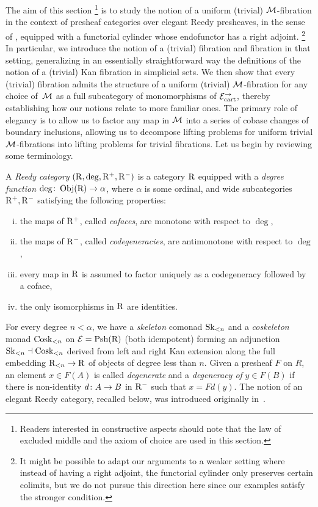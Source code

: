 \documentclass[reqno,10pt,a4paper,oneside,draft]{amsart}
\begin{document}
{{The aim of this section%
\footnote{Readers interested in constructive aspects should note that the law of excluded middle and the axiom of choice are used in this section.}
is to study the notion of a uniform (trivial) $\cal{M}$-fibration in the context of presheaf categories over elegant Reedy presheaves, in the sense of \cite{bergner-rezk-elegant}, equipped with a functorial cylinder whose endofunctor has a right adjoint.%
\footnote{It might be possible to adapt our arguments to a weaker setting where instead of having a right adjoint, the functorial cylinder only preserves certain colimits, but we do not pursue this direction here since our examples satisfy the stronger condition.}
In particular, we introduce the notion of a (trivial) fibration and fibration in that setting, generalizing in an essentially straightforward way the definitions of the notion of a (trivial) Kan fibration in simplicial sets.
We then show that every (trivial) fibration admits the structure of a uniform (trivial) $\cal{M}$-fibration for any choice of~$\cal{M}$ as a full subcategory of monomorphisms of $\cal{E}_{\cart}^\to$, thereby establishing how our notions relate to more familiar ones.
The primary role of elegancy is to allow us to factor any map in $\cal{M}$ into a series of cobase changes of boundary inclusions, allowing us to decompose lifting problems for uniform trivial $\cal{M}$-fibrations into lifting problems for trivial fibrations.
Let us begin by reviewing some terminology.

\begin{definition}
A \emph{Reedy category} $(\R, \deg, \Rp, \Rm)$ is a category $\R$ equipped with a \emph{degree function} $\deg \co \obj(\R) \to \alpha$, where $\alpha$ is some ordinal, and wide subcategories $\Rp, \Rm$ satisfying the following properties:
\begin{enumerate}[(i)]
\item the maps of $\Rp$, called \emph{cofaces}, are monotone with respect to $\deg$,
\item the maps of $\Rm$, called \emph{codegeneracies}, are antimonotone with respect to $\deg$,
\item every map in $\R$ is assumed to factor uniquely as a codegeneracy followed by a coface,
\item the only isomorphisms in $\R$ are identities.
\end{enumerate}
\end{definition}

For every degree $n < \alpha$, we have a \emph{skeleton} comonad $\Sk_{<n}$ and a \emph{coskeleton} monad $\Cosk_{<n}$ on $\catE = \Psh(\R)$ (both idempotent) forming an adjunction $\Sk_{<n} \dashv \Cosk_{<n}$ derived from left and right Kan extension along the full embedding $\R_{<n} \to \R$ of objects of degree less than $n$.
Given a presheaf $F$ on $R$, an element $x \in F(A)$ is called \emph{degenerate} and a \emph{degeneracy of} $y \in F(B)$ if there is non-identity $d \co A \to B$ in $\Rm$ such that $x = Fd(y)$.
The notion of an elegant Reedy category, recalled below, was introduced originally in~\cite{bergner-rezk-elegant}.

}}
\end{document}
